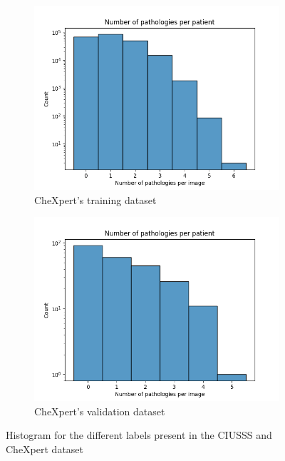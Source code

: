 \documentclass[11pt]{article}
\begin{document}
\begin{figure}[!h]
     \begin{subfigure}[b]{0.45\linewidth}
         \centering
         \includegraphics[width=\linewidth]{plots/disease_count_chexpert_train}
         \caption{CheXpert's training dataset}
         \vspace{4ex}
         \label{fig:count_chexpert_train}
     \end{subfigure}
     \hfill
     \begin{subfigure}[b]{0.45\linewidth}
         \centering
         \includegraphics[width=\linewidth]{plots/disease_count_chexpert_valid}
         \caption{CheXpert's validation dataset}
         \vspace{4ex}
         \label{fig:count_chexpert_valid}
     \end{subfigure}

     \caption{Histogram for the different labels present in the CIUSSS and CheXpert dataset}

\end{figure}
\end{document}
